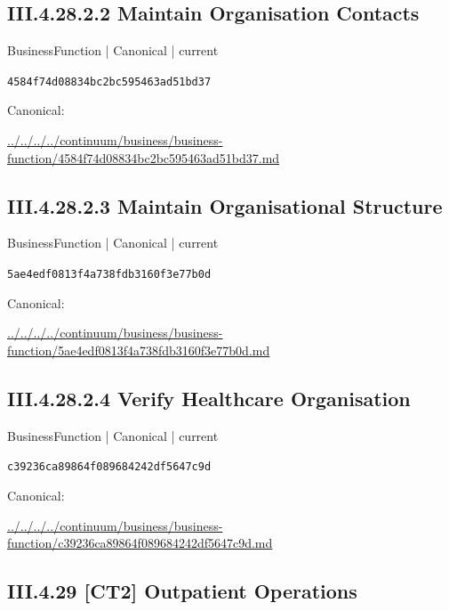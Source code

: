\documentclass[10pt,a4paper]{article}
\begin{document}
\subsection*{III.4.28.2.2 Maintain Organisation Contacts}
{\small BusinessFunction | Canonical | current}\par
\texttt{4584f74d08834bc2bc595463ad51bd37}\par
Canonical: \par
{\footnotesize\url{../../../../continuum/business/business-function/4584f74d08834bc2bc595463ad51bd37.md}}\par
\subsection*{III.4.28.2.3 Maintain Organisational Structure}
{\small BusinessFunction | Canonical | current}\par
\texttt{5ae4edf0813f4a738fdb3160f3e77b0d}\par
Canonical: \par
{\footnotesize\url{../../../../continuum/business/business-function/5ae4edf0813f4a738fdb3160f3e77b0d.md}}\par
\subsection*{III.4.28.2.4 Verify Healthcare Organisation}
{\small BusinessFunction | Canonical | current}\par
\texttt{c39236ca89864f089684242df5647c9d}\par
Canonical: \par
{\footnotesize\url{../../../../continuum/business/business-function/c39236ca89864f089684242df5647c9d.md}}\par
\subsection*{III.4.29 [CT2] Outpatient Operations}
\end{document}
